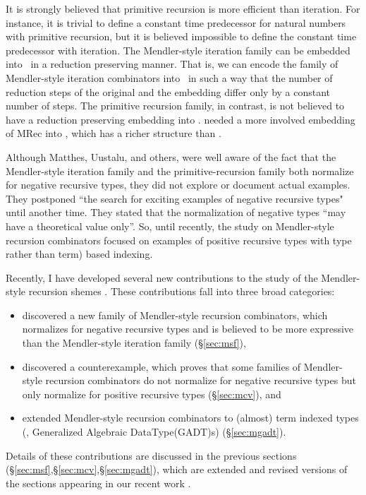 It is strongly believed that primitive recursion is more efficient than
iteration. For instance, it is trivial to define a constant time predecessor
for natural numbers with primitive recursion, but it is believed impossible
to define the constant time predecessor with iteration. The Mendler-style
iteration family can be embedded into \Fw\ in a reduction preserving manner.
That is, we can encode the family of Mendler-style iteration combinators
into \Fw\ in such a way that the number of reduction steps of the original
and the embedding differ only by a constant number of steps. The primitive
recursion family, in contrast, is not believed to have a reduction preserving
embedding into \Fw. \citet{AbeMat04} needed a more involved embedding of
\textsf{MRec} into \Fixw, which has a richer structure than \Fw.

Although Matthes, Uustalu, and others, were well aware of the fact that
the Mendler-style iteration family and the primitive-recursion family both
normalize for negative recursive types, they did not explore or document actual
examples. They postponed ``the search for exciting examples of negative
recursive types" until another time. They stated that the normalization
of negative types ``may have a theoretical value
only''\cite{UusVen99}. So, until recently, the study on Mendler-style recursion
combinators focused on examples of positive recursive types with type
rather than term) based indexing.

Recently, I have developed several new contributions to the study of
the Mendler-style recursion shemes \cite{AhnShe11}. These contributions
fall into three broad categories:
\begin{itemize}
\item discovered a new family of Mendler-style recursion combinators,
	which normalizes for negative recursive types and is believed
	to be more expressive than the Mendler-style iteration family
	(\S\ref{sec:msf}),
\item discovered a counterexample, which proves that
	some families of Mendler-style recursion combinators
	do not normalize for negative recursive types
	but only normalize for positive recursive types (\S\ref{sec:mcv}), and
\item extended Mendler-style recursion combinators to (almost)
	term indexed types (\ie, Generalized Algebraic DataType(GADT)s)
	(\S\ref{sec:mgadt}).
\end{itemize}
Details of these contributions are discussed in the previous sections
(\S\ref{sec:msf},\S\ref{sec:mcv},\S\ref{sec:mgadt}), which are extended and
revised versions of the sections appearing in our recent work \cite{AhnShe11}.


